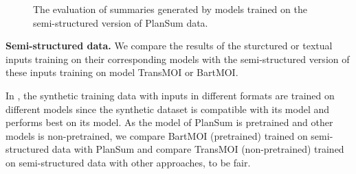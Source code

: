 \begin{figure} \centering 
	\caption{The evaluation of summaries generated by models trained on the semi-structured version of PlanSum data.} 
	\label{fig:acdv} 
\end{figure} 

\textbf{Semi-structured data.}
We compare the results of the sturctured or textual inputs training on their corresponding models with the semi-structured version of these inputs training on model TransMOI or BartMOI.

In , the synthetic training data with inputs in different formats are trained on different models since
the synthetic dataset is compatible with its model 
and performs best on its model.
As the model of PlanSum is pretrained and other models is non-pretrained,
we compare BartMOI (pretrained) trained on semi-structured data
with PlanSum and compare TransMOI (non-pretrained) trained on semi-structured data with other approaches, to be fair.

